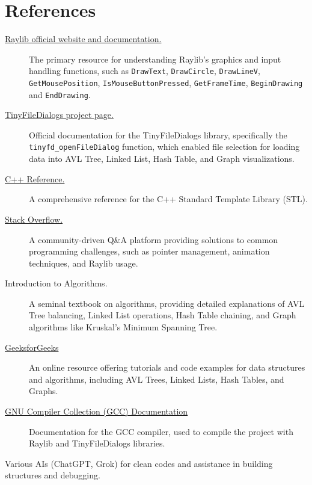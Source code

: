\documentclass{article}
\begin{document}
\section{References}
\begin{description}
	\item[\href{https://www.raylib.com/}{Raylib official website and documentation.}] The primary resource for understanding Raylib's graphics and input handling functions, such as \lstinline|DrawText|, \lstinline|DrawCircle|, \lstinline|DrawLineV|, \lstinline|GetMousePosition|, \lstinline|IsMouseButtonPressed|, \lstinline|GetFrameTime|, \lstinline|BeginDrawing| and \lstinline|EndDrawing|.
	\item[\href{https://sourceforge.net/projects/tinyfiledialogs/}{TinyFileDialogs project page.}] Official documentation for the TinyFileDialogs library, specifically the \lstinline|tinyfd_openFileDialog| function, which enabled file selection for loading data into AVL Tree, Linked List, Hash Table, and Graph visualizations.
	\item[\href{https://en.cppreference.com/w/}{C++ Reference.}] A comprehensive reference for the C++ Standard Template Library (STL).
	\item[\href{https://stackoverflow.com/}{Stack Overflow.}] A community-driven Q\&A platform providing solutions to common programming challenges, such as pointer management, animation techniques, and Raylib usage.
	\item[Introduction to Algorithms.] A seminal textbook on algorithms, providing detailed explanations of AVL Tree balancing, Linked List operations, Hash Table chaining, and Graph algorithms like Kruskal's Minimum Spanning Tree.
	\item[\href{https://www.geeksforgeeks.org/}{GeeksforGeeks}] An online resource offering tutorials and code examples for data structures and algorithms, including AVL Trees, Linked Lists, Hash Tables, and Graphs.
	\item[\href{https://gcc.gnu.org/onlinedocs/}{GNU Compiler Collection (GCC) Documentation}] Documentation for the GCC compiler, used to compile the project with Raylib and TinyFileDialogs libraries.
	\item[Various AIs (ChatGPT, Grok) for clean codes and assistance in building structures and debugging.] 
\end{description}
\end{document}
